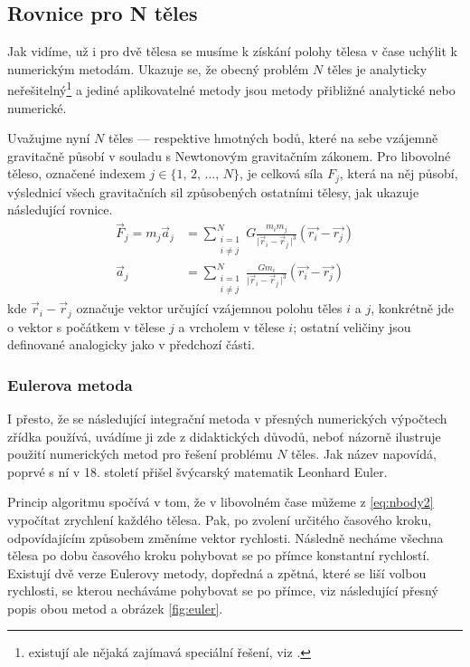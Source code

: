 \documentclass[A4paper, 12pt, oneside]{book}
\newcommand{\abs}[1]{\lvert #1 \,\rvert}
\begin{document}
\subsection{Rovnice pro N těles}
Jak vidíme, už i pro dvě tělesa se musíme k získání polohy tělesa v čase uchýlit k numerickým metodám. Ukazuje se, že obecný problém $N$ těles je analyticky neřešitelný\footnote{existují ale nějaká zajímavá speciální řešení, viz \cite{cohan12}.} a jediné aplikovatelné metody jsou metody přibližné analytické nebo numerické.

Uvažujme nyní $N$ těles --- respektive hmotných bodů, které na sebe vzájemně gravitačně působí v souladu s Newtonovým gravitačním zákonem. Pro libovolné těleso, označené indexem $j\in\{1,\,2,\,\dots,\,N\}$, je celková síla $F_j$, která na něj působí, výslednicí všech gravitačních sil způsobených ostatními tělesy, jak ukazuje následující rovnice.
\begin{align} 
	\vec{F}_j = m_j\vec{a}_j &= \sum_{\substack{i=1 \\ i\neq j}}^N G\frac{m_im_j}{\abs{\vec{r}_i-\vec{r}_j}^3}(\vec{r_i}-\vec{r_j}) \label{eq:nbody1}\\
		\vec{a}_j &= \sum_{\substack{i=1 \\ i\neq j}}^N \frac{Gm_i}{\abs{\vec{r}_i-\vec{r}_j}^3}(\vec{r_i}-\vec{r_j}) \label{eq:nbody2}
\end{align}
kde $\vec{r}_i-\vec{r}_j$ označuje vektor určující vzájemnou polohu těles $i$ a $j$, konkrétně jde o vektor s počátkem v tělese $j$ a vrcholem v tělese $i$; ostatní veličiny jsou definované analogicky jako v předchozí části.
\subsubsection{Eulerova metoda}
I přesto, že se následující integrační metoda v přesných numerických výpočtech zřídka používá, uvádíme ji zde z didaktických důvodů, neboť názorně ilustruje použití numerických metod pro řešení problému $N$ těles. Jak název napovídá, poprvé s ní v 18. století přišel švýcarský matematik Leonhard Euler.

Princip algoritmu spočívá v tom, že v libovolném čase můžeme z \eqref{eq:nbody2} vypočítat zrychlení každého tělesa. Pak, po zvolení určitého časového kroku, odpovídajícím způsobem změníme vektor rychlosti. Následně necháme všechna tělesa po dobu časového kroku pohybovat se po přímce konstantní rychlostí. Existují dvě verze Eulerovy metody, dopředná a zpětná, které se liší volbou rychlosti, se kterou necháváme pohybovat se po přímce, viz následující přesný popis obou metod a obrázek \ref{fig:euler}.
\end{document}
